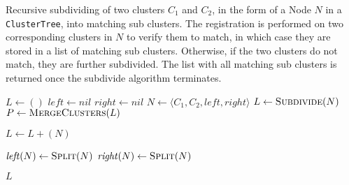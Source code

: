 \begin{algorithm}[tbp]
	\caption{Recursive subdividing of two clusters $C_1$ and $C_2$, in the form of a Node $\mathit{N}$ in a \texttt{ClusterTree}, into matching sub clusters. The registration is performed on two corresponding clusters in $\mathit{N}$ to verify them to match, in which case they are stored in a list of matching sub clusters. Otherwise, if the two clusters do not match, they are further subdivided. The list with all matching sub clusters is returned once the subdivide algorithm terminates.}
	\label{alg:subdivide}
	
	\begin{algorithmic}[1]     %
		\label{clusterTree}
		
		\State $L \gets ()$
		\State $\mathit{left} \gets \mathit{nil}$
		\State $\mathit{right} \gets \mathit{nil}$
		\State $N \gets \langle C_1, C_2, \mathit{left}, \mathit{right}\rangle$
		\State $L \gets \Call{Subdivide}{N}$
		\State $P \gets \Call{MergeClusters}{L}$
		
		\EndProcedure
	\end{algorithmic}
	
	\begin{algorithmic}[1]     %
		\label{subdivide}
		
		\State $L \gets L + (N)$
		
		\Else
		\State $\mathit{left}(N) \gets \Call{Split}{N}$
		\State $\mathit{right}(N) \gets \Call{Split}{N}$
		\State {}
		\State {}
		\EndIf
		
		\State\Return $L$
		\EndProcedure
		
	\end{algorithmic}
\end{algorithm}
